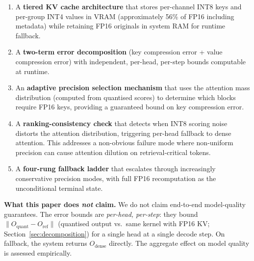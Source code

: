 \documentclass[11pt,a4paper]{article}
\theoremstyle{definition}
\theoremstyle{remark}
\newcommand{\norm}[1]{\lVert #1 \rVert}
\begin{document}
\begin{enumerate}[leftmargin=2em,itemsep=4pt]
  \item A \textbf{tiered KV cache architecture} that stores per-channel INT8 keys and per-group INT4 values in VRAM (approximately 56\% of FP16 including metadata) while retaining FP16 originals in system RAM for runtime fallback.

  \item A \textbf{two-term error decomposition} (key compression error + value compression error) with independent, per-head, per-step bounds computable at runtime.

  \item An \textbf{adaptive precision selection mechanism} that uses the attention mass distribution (computed from quantised scores) to determine which blocks require FP16 keys, providing a guaranteed bound on key compression error.

  \item A \textbf{ranking-consistency check} that detects when INT8 scoring noise distorts the attention distribution, triggering per-head fallback to dense attention.  This addresses a non-obvious failure mode where non-uniform precision can cause attention dilution on retrieval-critical tokens.

  \item A \textbf{four-rung fallback ladder} that escalates through increasingly conservative precision modes, with full FP16 recomputation as the unconditional terminal state.
\end{enumerate}

\textbf{What this paper does \emph{not} claim.}  We do not claim end-to-end model-quality guarantees.  The error bounds are \emph{per-head, per-step}: they bound $\norm{O_{\mathrm{quant}} - O_{\mathrm{ref}}}$ (quantised output vs.\ same kernel with FP16 KV; Section~\ref{sec:decomposition}) for a single head at a single decode step.  On fallback, the system returns $O_{\mathrm{dense}}$ directly.  The aggregate effect on model quality is assessed empirically.
\end{document}
